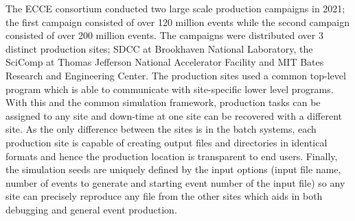 	The ECCE consortium conducted two large scale production campaigns in 2021; the first campaign consisted of over 120 million events while the second campaign consisted of over 200 million events. The campaigns were distributed over 3 distinct production sites; SDCC at Brookhaven National Laboratory, the SciComp at Thomas Jefferson National Accelerator Facility and MIT Bates Research and Engineering Center. The production sites used a common top-level program which is able to communicate with site-specific lower level programs. With this and the common simulation framework, production tasks can be assigned to any site and down-time at one site can be recovered with a different site. As the only difference between the sites is in the batch systems, each production site is capable of creating output files and directories in identical formats and hence the production location is transparent to end users. Finally, the simulation seeds are uniquely defined by the input options (input file name, number of events to generate and starting event number of the input file) so any site can precisely reproduce any file from the other sites which aids in both debugging and general event production.

